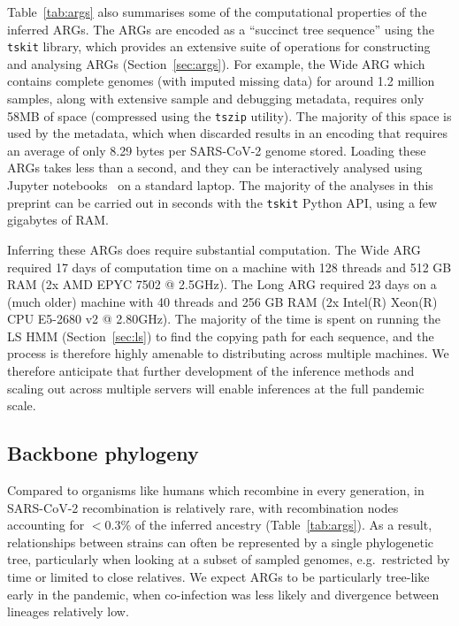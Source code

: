 \documentclass{article}
\begin{document}
Table~\ref{tab:args} also summarises some of the computational
properties of the inferred ARGs.
The ARGs are encoded as a ``succinct tree sequence'' using
the \texttt{tskit} library, which provides an extensive
suite of operations for constructing and analysing ARGs
(Section~\ref{sec:args}). For example, the Wide ARG
which contains complete genomes (with imputed missing data)
for around 1.2 million samples, along with extensive sample
and debugging metadata, requires only 58MB of space (compressed
using the \texttt{tszip} utility). The majority of this
space is used by the metadata, which when discarded results in
an encoding that requires an average of only 8.29 bytes per
SARS-CoV-2 genome stored.
Loading these ARGs takes less than a second, and they can be interactively
analysed using Jupyter notebooks~\citep{Kluyver2016-jupyter}
on a standard laptop. The majority
of the analyses in this preprint can be carried out in seconds
with the \texttt{tskit} Python API, using a few gigabytes of RAM.

Inferring these ARGs does require substantial computation.
The Wide ARG required 17 days of computation time on a machine with
128 threads and 512 GB RAM (2x AMD EPYC 7502 @ 2.5GHz). The Long ARG
required 23 days on a (much older) machine with 40 threads and 256 GB RAM (2x
Intel(R) Xeon(R) CPU E5-2680 v2 @ 2.80GHz). The majority of the time is spent
on running the LS HMM (Section~\ref{sec:ls}) to find the copying
path for each sequence, and the process
is therefore highly amenable to distributing across multiple machines.
We therefore anticipate that further development of the
inference methods and scaling out across multiple servers will
enable inferences at the full pandemic scale.


\subsection{Backbone phylogeny}
\label{sec:backbone_phylogeny}
Compared to organisms like humans which recombine in every generation,
in SARS-CoV-2 recombination is relatively rare, with recombination nodes accounting
for $<$0.3\% of the inferred ancestry (Table~\ref{tab:args}). As a result,
relationships between strains can often be represented by a
single phylogenetic tree, particularly when looking at
a subset of sampled genomes, e.g.\ restricted by time or limited to close
relatives. We expect ARGs to be particularly tree-like
early in the pandemic, when co-infection was less likely and divergence between
lineages relatively low.
\end{document}
